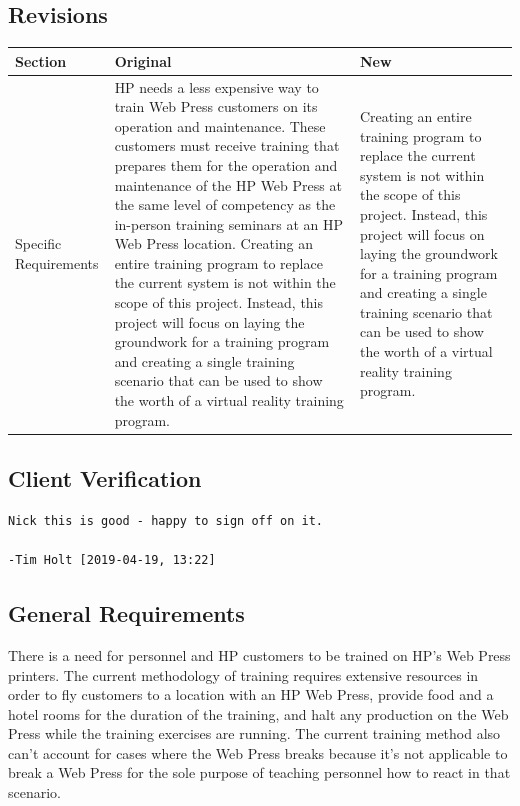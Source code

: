\documentclass[onecolumn, draftclsnofoot,10pt, compsoc]{IEEEtran}
\begin{document}
\subsection*{Revisions}

\begin{table}[ht!]
\begin{tabularx}{\textwidth}{|l|X|X|}
\hline
\rowcolor[HTML]{C0C0C0} 
Section & Original & New \\ \hline
Specific Requirements &  HP needs a less expensive way to train Web Press customers on its operation and maintenance. These customers must receive training that prepares them for the operation and maintenance of the HP Web Press at the same level of competency as the in-person training seminars at an HP Web Press location. Creating an entire training program to replace the current system is not within the scope of this project. Instead, this project will focus on laying the groundwork for a training program and creating a single training scenario that can be used to show the worth of a virtual reality training program.    & Creating an entire training program to replace the current system is not within the scope of this project. Instead, this project will focus on laying the groundwork for a training program and creating a single training scenario that can be used to show the worth of a virtual reality training program.   \\ \hline
\end{tabularx}
\end{table}

\subsection*{Client Verification}

\begin{Verbatim}[frame=single]
Nick this is good - happy to sign off on it.

-Tim Holt [2019-04-19, 13:22]
\end{Verbatim}

\subsection{General Requirements}
There is a need for personnel and HP customers to be trained on HP's Web Press printers. The current methodology of training requires extensive resources in order to fly customers to a location with an HP Web Press, provide food and a hotel rooms for the duration of the training, and halt any production on the Web Press while the training exercises are running. The current training method also can't account for cases where the Web Press breaks because it's not applicable to break a Web Press for the sole purpose of teaching personnel how to react in that scenario.
\end{document}
